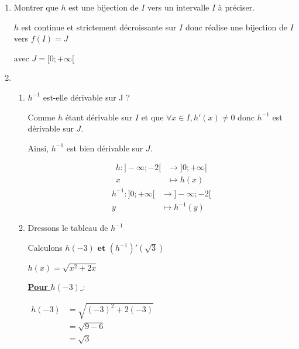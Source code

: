 \documentclass[12pt,a4paper]{article}
\begin{document}
\begin{enumerate}
    \item Montrer que \( h \) est une bijection de \( I \) vers un intervalle \( I \) à préciser.

    \( h \) est continue et strictement décroissante sur \( I \) donc réalise une bijection de \( I \) vers \( f(I) = J \)

    avec \( J = [ 0; +\infty [ \)

    \item 
    \begin{enumerate}
        \item \( h^{-1} \) est-elle dérivable sur J ?
    
    Comme \( h \) étant dérivable sur \( I \) et que  \( \forall x\in I, h'(x) \neq 0 \) donc \( h^{-1} \) est dérivable sur \( J \).

    Ainsi, \( h^{-1} \) est bien dérivable sur \( J \).

\begin{align*}
h:]-\infty ; -2[&\rightarrow ]0; +\infty [\\
x&\mapsto h(x)
\end{align*}
\begin{align*}
h^{-1}:]0; +\infty [&\rightarrow ]-\infty ; -2[\\
y&\mapsto h^{-1}(y)
\end{align*}

    \item Dressons le tableau de \( h^{-1} \)

    \begin{center}
    \end{center}
    Calculons \( h(-3) \textbf{ et } (h^{-1})'( \sqrt{3} )  \)

    \( h(x) = \sqrt{x^{2}+2x} \)

    \underline{\textbf{Pour}  \( h(-3)  \) } : 

\(
    \begin{aligned}
        h(-3) &= \sqrt{(-3)^{2}+2(-3)}\\
              &= \sqrt{9 - 6}\\
              &= \sqrt{3}
    \end{aligned}
\)


\end{enumerate}
\end{enumerate}
\end{document}
